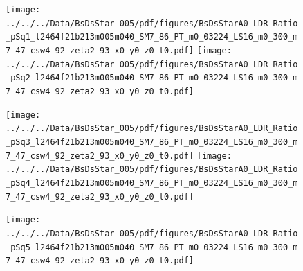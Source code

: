 \documentclass[a4paper,10pt]{article}
\begin{document}
\begin{figure}[p]
 \texttt{[image: ../../../Data/BsDsStar\_005/pdf/figures/BsDsStarA0\_LDR\_Ratio\_pSq1\_l2464f21b213m005m040\_SM7\_86\_PT\_m0\_03224\_LS16\_m0\_300\_m7\_47\_csw4\_92\_zeta2\_93\_x0\_y0\_z0\_t0.pdf]} 
 \texttt{[image: ../../../Data/BsDsStar\_005/pdf/figures/BsDsStarA0\_LDR\_Ratio\_pSq2\_l2464f21b213m005m040\_SM7\_86\_PT\_m0\_03224\_LS16\_m0\_300\_m7\_47\_csw4\_92\_zeta2\_93\_x0\_y0\_z0\_t0.pdf]} 
 \end{figure}
\clearpage
\begin{figure}[p]
 \texttt{[image: ../../../Data/BsDsStar\_005/pdf/figures/BsDsStarA0\_LDR\_Ratio\_pSq3\_l2464f21b213m005m040\_SM7\_86\_PT\_m0\_03224\_LS16\_m0\_300\_m7\_47\_csw4\_92\_zeta2\_93\_x0\_y0\_z0\_t0.pdf]} 
 \texttt{[image: ../../../Data/BsDsStar\_005/pdf/figures/BsDsStarA0\_LDR\_Ratio\_pSq4\_l2464f21b213m005m040\_SM7\_86\_PT\_m0\_03224\_LS16\_m0\_300\_m7\_47\_csw4\_92\_zeta2\_93\_x0\_y0\_z0\_t0.pdf]} 
 \end{figure}
\begin{figure}[p]
 \texttt{[image: ../../../Data/BsDsStar\_005/pdf/figures/BsDsStarA0\_LDR\_Ratio\_pSq5\_l2464f21b213m005m040\_SM7\_86\_PT\_m0\_03224\_LS16\_m0\_300\_m7\_47\_csw4\_92\_zeta2\_93\_x0\_y0\_z0\_t0.pdf]} 
 \end{figure}
\clearpage
\end{document}
